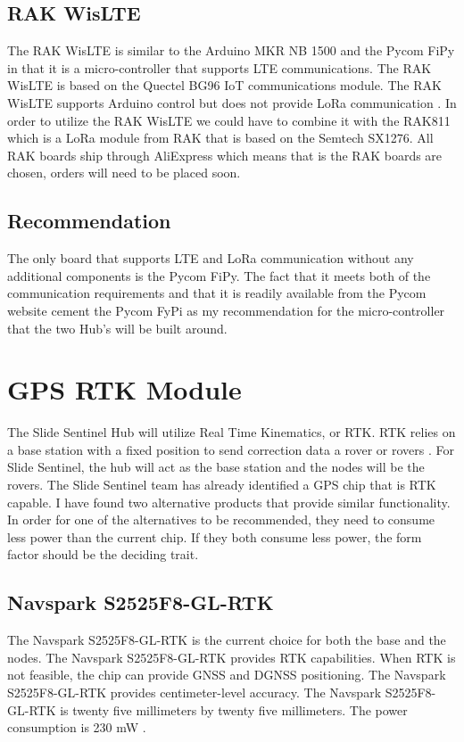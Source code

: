 \documentclass[onecolumn, draftclsnofoot,10pt, compsoc]{IEEEtran}
\begin{document}
    \subsection{RAK WisLTE}
        The RAK WisLTE is similar to the Arduino MKR NB 1500 and the Pycom FiPy in that it is a micro-controller that supports LTE communications. The RAK WisLTE is based on the Quectel BG96 IoT communications module. The RAK WisLTE supports Arduino control but does not provide LoRa communication \cite{website:RAKLTE}. In order to utilize the RAK WisLTE we could have to combine it with the RAK811 which is a LoRa module from RAK that is based on the Semtech SX1276\cite{website:RAKLoRa}. All RAK boards ship through AliExpress which means that is the RAK boards are chosen, orders will need to be placed soon.
    \subsection{Recommendation}
        The only board that supports LTE and LoRa communication without any additional components is the Pycom FiPy. The fact that it meets both of the communication requirements and that it is readily available from the Pycom website cement the Pycom FyPi as my recommendation for the micro-controller that the two Hub's will be built around. 
        
\section{GPS RTK Module}
    The Slide Sentinel Hub will utilize Real Time Kinematics, or RTK. RTK relies on a base station with a fixed position to send correction data a rover or rovers \cite{website:RTK}. For Slide Sentinel, the hub will act as the base station and the nodes will be the rovers. The Slide Sentinel team has already identified a GPS chip that is RTK capable. I have found two alternative products that provide similar functionality. In order for one of the alternatives to be recommended, they need to consume less power than the current chip. If they both consume less power, the form factor should be the deciding trait.
    \subsection{Navspark S2525F8-GL-RTK}
        The Navspark S2525F8-GL-RTK is the current choice for both the base and the nodes. The Navspark S2525F8-GL-RTK provides RTK capabilities. When RTK is not feasible, the chip can provide GNSS and DGNSS positioning. The Navspark S2525F8-GL-RTK provides centimeter-level accuracy. The Navspark S2525F8-GL-RTK is twenty five millimeters by twenty five millimeters. The power consumption is 230 mW \cite{website:Nav}.
\end{document}
